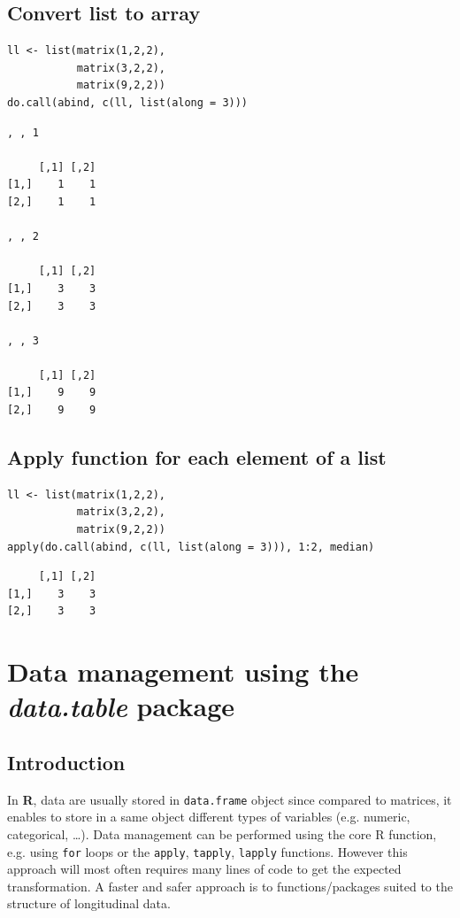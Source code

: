 \documentclass{article}
\newcommand\Rlogo{\textbf{\textsf{R}}\xspace}
\begin{document}
\subsection{Convert list to array}
\label{sec:org5394288}

\lstset{language=r,label= ,caption= ,captionpos=b,numbers=none}
\begin{lstlisting}
ll <- list(matrix(1,2,2),
           matrix(3,2,2),
           matrix(9,2,2))
do.call(abind, c(ll, list(along = 3)))
\end{lstlisting}

\begin{verbatim}
, , 1

     [,1] [,2]
[1,]    1    1
[2,]    1    1

, , 2

     [,1] [,2]
[1,]    3    3
[2,]    3    3

, , 3

     [,1] [,2]
[1,]    9    9
[2,]    9    9
\end{verbatim}

\subsection{Apply function for each element of a list}
\label{sec:orgf5d68b2}


\lstset{language=r,label= ,caption= ,captionpos=b,numbers=none}
\begin{lstlisting}
ll <- list(matrix(1,2,2),
           matrix(3,2,2),
           matrix(9,2,2))
apply(do.call(abind, c(ll, list(along = 3))), 1:2, median)
\end{lstlisting}

\begin{verbatim}
     [,1] [,2]
[1,]    3    3
[2,]    3    3
\end{verbatim}

\section{Data management using the \emph{data.table} package}
\label{sec:org2766200}
\subsection{Introduction}
\label{sec:orgf3e1153}
In \Rlogo, data are usually stored in \texttt{data.frame} object since compared
to matrices, it enables to store in a same object different types of
variables (e.g. numeric, categorical, \ldots{}). Data management can be
performed using the core R function, e.g. using \texttt{for} loops or
the \texttt{apply}, \texttt{tapply}, \texttt{lapply} functions.  However this approach will
most often requires many lines of code to get the expected
transformation.  A faster and safer approach is to functions/packages
suited to the structure of longitudinal data.
\end{document}
